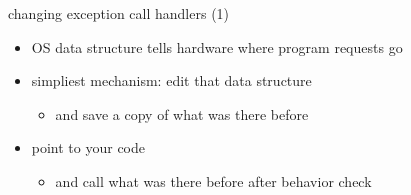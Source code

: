 \begin{frame}{changing exception call handlers (1)}
    \begin{itemize}
    \item OS data structure tells hardware where program requests go
    \item simpliest mechanism: edit that data structure
       \begin{itemize}
       \item and save a copy of what was there before
       \end{itemize}
    \item point to your code
        \begin{itemize}
        \item and call what was there before after behavior check
        \end{itemize}
    \end{itemize}
\end{frame}

